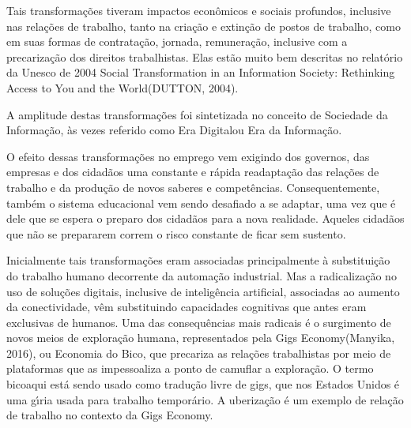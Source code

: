 \documentclass[
12pt,		%
openright,	%
twoside,  %
a4paper,			%
chapter=TITLE,		%
english,			%
french,				%
spanish,			%
brazil				%
]{USPSC-classe/USPSC}
\begin{document}
Tais transforma\c{c}\~oes tiveram impactos econ\^omicos e sociais profundos, inclusive nas rela\c{c}\~oes de trabalho, tanto na cria\c{c}\~ao e extin\c{c}\~ao de postos de trabalho, como em suas formas de contrata\c{c}\~ao, jornada, remunera\c{c}\~ao, inclusive com a precariza\c{c}\~ao dos direitos trabalhistas. Elas est\~ao muito bem descritas  no relat\'orio da Unesco  de 2004 \textquotedbl Social Transformation in an Information Society: Rethinking Access to You and the World\textquotedbl  (DUTTON, 2004).










A amplitude destas transforma\c{c}\~oes foi sintetizada no conceito de \textquotedbl Sociedade da Informa\c{c}\~ao\textquotedbl , \`as vezes referido como \textquotedbl Era Digital\textquotedbl  ou \textquotedbl Era da Informa\c{c}\~ao\textquotedbl .










O efeito dessas transforma\c{c}\~oes no emprego vem exigindo dos governos, das empresas e dos cidad\~aos uma constante e r\'apida readapta\c{c}\~ao  das rela\c{c}\~oes de trabalho e da produ\c{c}\~ao de novos saberes e compet\^encias. Consequentemente, tamb\'em o sistema educacional vem sendo desafiado a se adaptar, uma vez que \'e dele que se espera o preparo dos cidad\~aos para a nova realidade. Aqueles cidad\~aos que n\~ao se prepararem correm o risco constante de ficar sem sustento.










Inicialmente tais transforma\c{c}\~oes eram associadas principalmente \`a substitui\c{c}\~ao do trabalho humano decorrente da automa\c{c}\~ao industrial. Mas a radicaliza\c{c}\~ao no uso de solu\c{c}\~oes digitais, inclusive de intelig\^encia artificial, associadas ao aumento da conectividade, v\^em substituindo capacidades \textquotedbl cognitivas que antes eram exclusivas de humanos\textquotedbl [4 XXX]. Uma das consequ\^encias mais radicais \'e o surgimento de novos meios de explora\c{c}\~ao humana, representados pela \textquotedbl Gigs Economy\textquotedbl   (Manyika, 2016), ou \textquotedbl Economia do Bico\textquotedbl , que precariza as rela\c{c}\~oes trabalhistas por meio de plataformas que as impessoaliza a ponto de camuflar a explora\c{c}\~ao. O termo \textquotedbl bico\textquotedbl  aqui est\'a sendo usado como tradu\c{c}\~ao livre de \textquotedbl gigs\textquotedbl , que nos Estados Unidos \'e uma g\'{\i}ria usada para trabalho tempor\'ario. A uberiza\c{c}\~ao \'e um exemplo de rela\c{c}\~ao de trabalho no contexto da Gigs Economy.
\end{document}
